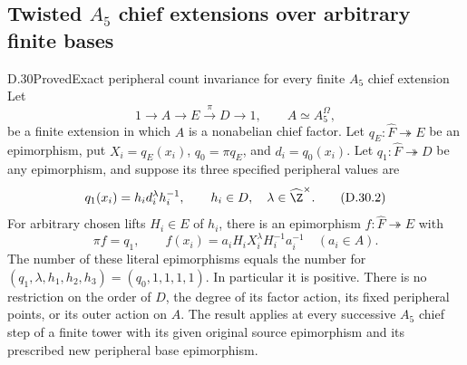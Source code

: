 \subsection{Twisted \texorpdfstring{$A_5$}{A5} chief extensions over arbitrary finite bases}

\begin{statement}{D.30}{Proved}{Exact peripheral count invariance for every finite $A_5$ chief extension}
Let
\[
 1\longrightarrow A\longrightarrow E\xrightarrow{\pi}D
 \longrightarrow1,\qquad A\simeq A_5^{\Omega},
 \tag{D.30.1}
\]
be a finite extension in which $A$ is a nonabelian chief
factor.  Let $q_E:\widehat F\twoheadrightarrow E$ be an
epimorphism, put $X_i=q_E(x_i)$, $q_0=\pi q_E$, and
$d_i=q_0(x_i)$.  Let $q_1:\widehat F\twoheadrightarrow D$
be any epimorphism, and suppose its three specified
peripheral values are
\[
 q_1(x_i)=h_i d_i^\lambda h_i^{-1},\qquad
 h_i\in D,\quad \lambda\in\widehat\Z^\times.
 \tag{D.30.2}
\]
For arbitrary chosen lifts $H_i\in E$ of $h_i$, there
is an epimorphism $f:\widehat F\twoheadrightarrow E$
with
\[
 \pi f=q_1,\qquad
 f(x_i)=a_iH_iX_i^\lambda H_i^{-1}a_i^{-1}
                  \quad(a_i\in A).
 \tag{D.30.3}
\]
The number of these literal epimorphisms equals the
number for $(q_1,\lambda,h_1,h_2,h_3)=(q_0,1,1,1,1)$.
In particular it is positive.  There is no restriction
on the order of $D$, the degree of its factor action,
its fixed peripheral points, or its outer action on
$A$.  The result applies at every successive $A_5$
chief step of a finite tower with its given original
source epimorphism and its prescribed new peripheral
base epimorphism.
\end{statement}

